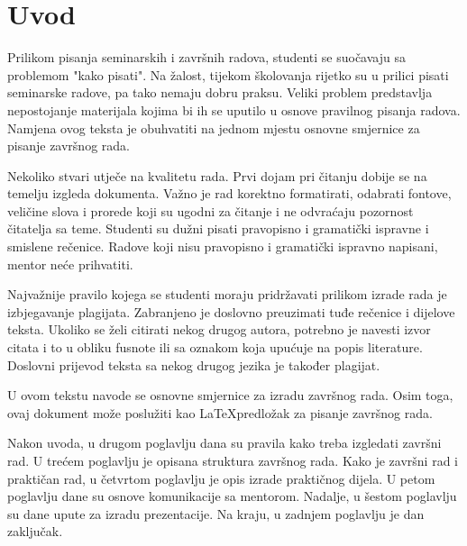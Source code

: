 \section{Uvod}
Prilikom pisanja seminarskih i završnih radova, studenti se suočavaju sa problemom "kako pisati". Na žalost, tijekom školovanja rijetko su u prilici 
pisati seminarske radove, pa tako 
nemaju dobru praksu. Veliki problem predstavlja nepostojanje materijala kojima bi ih se uputilo u osnove pravilnog pisanja radova. Namjena ovog teksta 
je obuhvatiti na jednom 
mjestu osnovne smjernice za pisanje završnog rada.

Nekoliko stvari utječe na kvalitetu rada. Prvi dojam pri čitanju dobije se na temelju izgleda dokumenta. Važno je rad korektno formatirati, odabrati fontove, 
veličine slova i prorede 
koji su ugodni za čitanje i ne odvraćaju pozornost čitatelja sa teme. Studenti su dužni pisati pravopisno i gramatički ispravne i smislene rečenice. 
Radove koji nisu pravopisno i gramatički ispravno napisani, mentor neće prihvatiti.

Najvažnije pravilo kojega se studenti moraju pridržavati prilikom izrade rada je izbjegavanje plagijata. Zabranjeno je doslovno preuzimati tuđe rečenice 
i dijelove teksta. Ukoliko 
se želi citirati nekog drugog autora, potrebno je navesti izvor citata i to u obliku fusnote ili sa oznakom koja upućuje na popis literature\nocite{*}. 
Doslovni prijevod teksta sa nekog drugog 
jezika je također plagijat.

U ovom tekstu navode se osnovne smjernice za izradu završnog rada. Osim toga, ovaj dokument može poslužiti kao \LaTeX predložak za pisanje završnog rada. 

Nakon uvoda, u drugom poglavlju dana su pravila kako treba izgledati završni rad. 
U trećem 
poglavlju je opisana struktura završnog rada. Kako je završni rad i praktičan rad, u četvrtom poglavlju je opis izrade praktičnog dijela. U petom poglavlju 
dane su osnove komunikacije sa mentorom. Nadalje, u 
šestom poglavlju su dane upute za izradu prezentacije. Na kraju, u zadnjem poglavlju je dan zaključak.


 